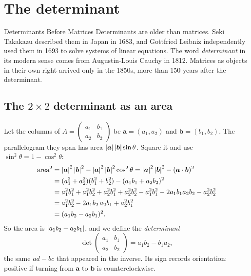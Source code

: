 \section{The determinant}\label{sec:linear-algebra-det}
\begin{didyouknow}{Determinants Before Matrices}
Determinants are older than matrices. Seki Takakazu described them in Japan in 1683, and Gottfried Leibniz independently used them in 1693 to solve systems of linear equations. The word \emph{determinant} in its modern sense comes from Augustin-Louis Cauchy in 1812. Matrices as objects in their own right arrived only in the 1850s, more than 150 years after the determinant.
\end{didyouknow}

\subsection{The $2\times2$ determinant as an area}

Let the columns of $A=\begin{pmatrix}a_1&b_1\\a_2&b_2\end{pmatrix}$ be $\bm a=(a_1,a_2)$ and $\bm b=(b_1,b_2)$. The parallelogram they span has area $\left\lvert \bm a\right\rvert\left\lvert \bm b\right\rvert\sin\theta$. Square it and use $\sin^2\theta=1-\cos^2\theta$:
\begin{align*}
\text{area}^2&=\left\lvert \bm a\right\rvert^2\left\lvert \bm b\right\rvert^2-\left\lvert \bm a\right\rvert^2\left\lvert \bm b\right\rvert^2\cos^2\theta=\left\lvert \bm a\right\rvert^2\left\lvert \bm b\right\rvert^2-(\bm a\cdot\bm b)^2\\
&=(a_1^2+a_2^2)(b_1^2+b_2^2)-(a_1b_1+a_2b_2)^2\\
&=a_1^2b_1^2+a_1^2b_2^2+a_2^2b_1^2+a_2^2b_2^2-a_1^2b_1^2-2a_1b_1a_2b_2-a_2^2b_2^2\\
&=a_1^2b_2^2-2a_1b_2\,a_2b_1+a_2^2b_1^2\\
&=(a_1b_2-a_2b_1)^2 .
\end{align*}
So the area is $\left\lvert a_1b_2-a_2b_1\right\rvert$, and we define the \emph{determinant}
\begin{equation}
\det\begin{pmatrix}a_1&b_1\\a_2&b_2\end{pmatrix}=a_1b_2-b_1a_2 ,
\label{eq:linear-algebra-det2}
\end{equation}
the same $ad-bc$ that appeared in the inverse. Its sign records orientation: positive if turning from $\bm a$ to $\bm b$ is counterclockwise.

